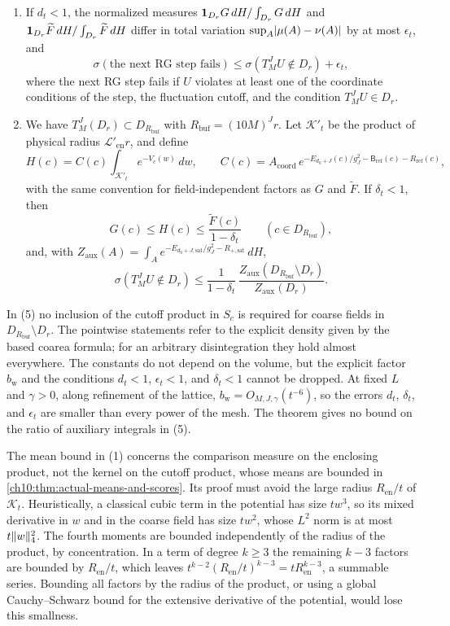 \begin{theorem}
\begin{enumerate}
\[
 \frac{\widetilde F(c)}{G(c)}=\kappa_c^{\mathrm{old}}(\Omega_p^{\mathrm w}),
\]
without any smallness assumption, and $1\le G(c)/\widetilde F(c)\le(1-\epsilon_t)^{-1}$ if $d_t<1$ and $\epsilon_t<1$.
\item If $d_t<1$, the normalized measures $\mathbf 1_{D_r}G\,dH/\int_{D_r}G\,dH$ and $\mathbf 1_{D_r}\widetilde F\,dH/\int_{D_r}\widetilde F\,dH$ differ in total variation $\sup_A\lvert \mu(A)-\nu(A)\rvert$ by at most $\epsilon_t$, and
\[
 \sigma(\text{the next RG step fails})\le\sigma(T_M^JU\notin D_r)+\epsilon_t,
\]
where the next RG step fails if $U$ violates at least one of the coordinate conditions of the step, the fluctuation cutoff, and the condition $T_M^JU\in D_r$.
\item We have $T_M^J(D_r)\subset D_{R_{\mathrm{buf}}}$ with $R_{\mathrm{buf}}=(10M)^Jr$. Let $\mathcal K'_t$ be the product of physical radius $\mathscr L'_{\mathrm{en}}r$, and define
\[
 H(c)=C(c)\int_{\mathcal K'_t}e^{-V_c(w)}\,dw,\qquad
 C(c)=A_{\mathrm{coord}}\,e^{-E_{d_0+J}(c)/g_J^2-\mathsf B_{\mathrm{ref}}(c)-R_{\mathrm{ref}}(c)},
\]
with the same convention for field-independent factors as $G$ and $\widetilde F$. If $\delta_t<1$, then
\[
 G(c)\le H(c)\le\frac{\widetilde F(c)}{1-\delta_t}\qquad(c\in D_{R_{\mathrm{buf}}}),
\]
and, with $Z_{\mathrm{aux}}(A)=\int_Ae^{-E_{d_0+J,\mathrm{sat}}/g_J^2-R_{+,\mathrm{sat}}}\,dH$,
\[
 \sigma(T_M^JU\notin D_r)\le\frac1{1-\delta_t}\,
 \frac{Z_{\mathrm{aux}}(D_{R_{\mathrm{buf}}}\setminus D_r)}{Z_{\mathrm{aux}}(D_r)}.
\]
\end{enumerate}
In (5) no inclusion of the cutoff product in $S_c$ is required for coarse fields in $D_{R_{\mathrm{buf}}}\setminus D_r$. The pointwise statements refer to the explicit density given by the based coarea formula; for an arbitrary disintegration they hold almost everywhere. The constants do not depend on the volume, but the explicit factor $b_{\mathrm w}$ and the conditions $d_t<1$, $\epsilon_t<1$, and $\delta_t<1$ cannot be dropped. At fixed $L$ and $\gamma>0$, along refinement of the lattice, $b_{\mathrm w}=O_{M,J,\gamma}(t^{-6})$, so the errors $d_t$, $\delta_t$, and $\epsilon_t$ are smaller than every power of the mesh. The theorem gives no bound on the ratio of auxiliary integrals in (5).
\end{theorem}

The mean bound in (1) concerns the comparison measure on the enclosing product, not the kernel on the cutoff product, whose means are bounded in \cref{ch10:thm:actual-means-and-scores}. Its proof must avoid the large radius $R_{\mathrm{en}}/t$ of $\mathcal K_t$. Heuristically, a classical cubic term in the potential has size $tw^3$, so its mixed derivative in $w$ and in the coarse field has size $tw^2$, whose $L^2$ norm is at most $t\lVert w\rVert_4^2$. The fourth moments are bounded independently of the radius of the product, by concentration. In a term of degree $k\ge3$ the remaining $k-3$ factors are bounded by $R_{\mathrm{en}}/t$, which leaves $t^{k-2}(R_{\mathrm{en}}/t)^{k-3}=tR_{\mathrm{en}}^{k-3}$, a summable series. Bounding all factors by the radius of the product, or using a global Cauchy--Schwarz bound for the extensive derivative of the potential, would lose this smallness.

